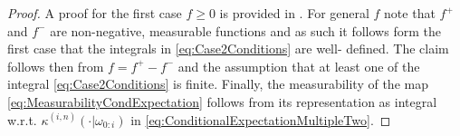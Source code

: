 \documentclass[
    a4paper,
    11pt,
    bibliography=totoc,
    listof=totoc,      
    headinclude=true,
    cleardoublepage=empty,
]{scrbook}
\theoremstyle{plain}
\newtheorem{lemma}[theorem]{Lemma}
\theoremstyle{definition}
\theoremstyle{remark}
\begin{document}
\begin{proof}
    A proof for the first case $f\geq 0$ is provided in 
    \cite[Lemma~14.23]{klenke2020_ptcc}. For general $f$ note that $f^+$ and
    $f^-$ are non-negative, measurable functions and as such it follows form
    the first case that the integrals in \eqref{eq:Case2Conditions} are well-
    defined. The claim follows then from $f=f^+ - f^-$ and the assumption that
    at least one of the integral \eqref{eq:Case2Conditions} is finite. 
    Finally, the measurability of the map 
    \eqref{eq:MeasurabilityCondExpectation} follows from its representation as 
    integral w.r.t. $\kappa^{(i,n)}(\cdot|\omega_{0:i})$ in 
    \cref{eq:ConditionalExpectationMultipleTwo}.
\end{proof}

\end{document}
